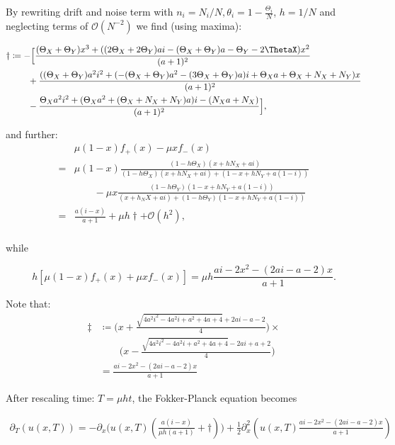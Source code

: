 By rewriting drift and noise term with $n_i = N_i/N, \theta_i = 1- \frac{\Theta_i}{N}$, $h = 1/N$ and neglecting terms of $\mathcal{O}(N^{-2})$ we find (using maxima):

\begin{align*}
	\dagger &\coloneqq -\Big[\frac{(\Theta_X + \Theta_Y)x^3 + ((2\Theta_X + 2\Theta_Y)ai -(\Theta_X + \Theta_Y)a - \Theta_Y - 2\ThetaX)x^2}{(a+1)^2}\Big.\\
	&\qquad + \Big.\frac{((\Theta_X + \Theta_Y)a^2 i^2 + (- (\Theta_X + \Theta_Y)a^2 -(3\Theta_X + \Theta_Y)a)i + \Theta_X a + \Theta_X + N_X + N_Y)x}{(a+1)^2}\Big.\\
	&\qquad - \Big.\frac{\Theta_X a^2 i^2 + (\Theta_X a^2 + (\Theta_X + N_X + N_Y) a)i - (N_X a + N_X)}{(a+1)^2}\Big],\\
\end{align*}

and further: 
\begin{align*}
& \mu(1-x)f_+(x) - \mu xf_-(x)\\
= & \mu(1-x) \frac{(1-h\Theta_X) (x+ hN_X+ ai)}{(1-h\Theta_X) (x + hN_X + ai) + (1-x + hN_Y + a(1-i))}\\
&\qquad - \mu x \frac{(1-h\Theta_Y)(1-x+hN_Y+a(1-i))}{(x+h_NX+ai) + (1-h\Theta_Y)(1-x+hN_Y+a(1-i))}\\
=& \frac{a(i-x)}{a+1} + \mu h \dagger + \mathcal{O}(h^2),\\
\end{align*}

while 

\begin{equation*}
h\left[\mu(1-x)f_+(x) + \mu xf_-(x)\right] = \mu h \frac{ai - 2x^2 - (2ai - a -2)x}{a+1}.
\end{equation*}

Note that:
\begin{align*}
\ddagger &\coloneqq \Big(x+\frac{\sqrt{4a^2i^2-4a^2i+a^2+4a+4}+2ai-a-2}{4}\Big) \times\\
&\qquad \Big(x-\frac{\sqrt{4a^2i^2-4a^2i+a^2+4a+4}-2ai+a+2}{4}\Big)\\
&=\frac{ai - 2x^2 - (2ai - a -2)x}{a+1}
\end{align*}


After rescaling time: $T = \mu h t$, the Fokker-Planck equation becomes

\begin{align*}
\partial_T \left(u\left(x, T\right)\right) = -\partial_x\big(u(x,T)\left(\frac{a(i-x)}{\mu h(a+1)} + \dagger \right)\big) + \frac{1}{2} \partial^2_x\left(u(x,T)\frac{ai - 2x^2 - (2ai - a -2)x}{a+1}\right)
\end{align*}

